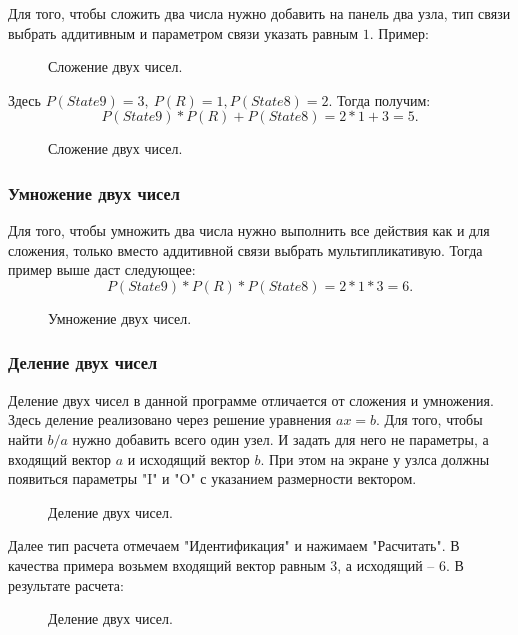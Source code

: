 \documentclass{article}
\numberwithin{equation}{section}
\begin{document}
\qquad Для того, чтобы сложить два числа нужно добавить на панель два узла, тип связи выбрать аддитивным и параметром связи указать равным $1$.
Пример:

\begin{figure}[h]
\caption{Сложение двух чисел.}
\label{ris:image8}
\end{figure}


Здесь $P(State9) = 3, \ P(R) = 1, P(State8) = 2.$
Тогда получим:
$$
P(State9) * P(R) + P(State8) = 2 * 1 + 3 = 5.
$$
\begin{figure}[h]
\caption{Сложение двух чисел.}
\label{ris:image9}
\end{figure}

\subsubsection{Умножение двух чисел}

\qquad Для того, чтобы умножить два числа нужно выполнить все действия как и для сложения, только вместо аддитивной связи выбрать мультипликативую. Тогда пример выше даст следующее:
$$
P(State9) * P(R) * P(State8) = 2 * 1 * 3 = 6.
$$
\begin{figure}[h]
\caption{Умножение двух чисел.}
\label{ris:image10}
\end{figure}
 \newpage

\subsubsection{Деление двух чисел}

\qquad Деление двух чисел в данной программе отличается от сложения и умножения. Здесь деление реализовано через решение уравнения $ax = b$. Для того, чтобы найти $b/a$ нужно добавить всего один узел. И задать для него не параметры, а входящий вектор $a$ и исходящий вектор $b$. При этом на экране у узлса должны появиться параметры "I" и "O" с указанием размерности вектором. 

\begin{figure}[h]
\caption{Деление двух чисел.}
\label{ris:image11}
\end{figure}

Далее тип расчета отмечаем "Идентификация" и нажимаем "Расчитать". В качества примера возьмем входящий вектор равным $3$, а исходящий -- $6$. В результате расчета:
\begin{figure}[h]
\caption{Деление двух чисел.}
\label{ris:image12}
\end{figure}
\end{document}
